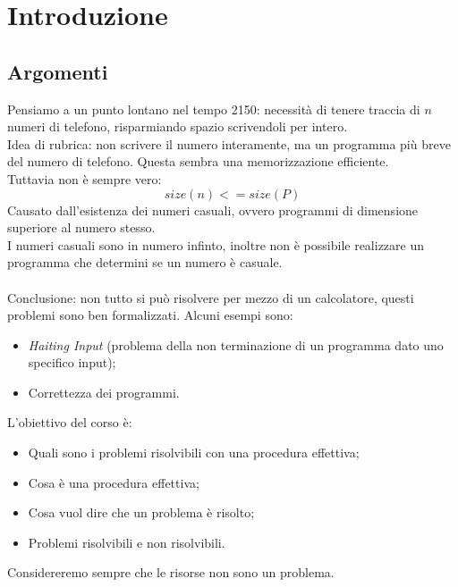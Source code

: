 \documentclass[10pt,a4paper]{book}
\begin{document}
\chapter{Introduzione}
\section{Argomenti}
Pensiamo a un punto lontano nel tempo 2150: necessit\`a di tenere traccia di $n$ numeri di telefono, risparmiando spazio scrivendoli per intero.\\
Idea di rubrica: non scrivere il numero interamente, ma un programma pi\`u breve del numero di telefono. Questa sembra una memorizzazione efficiente.\\
Tuttavia non \`e sempre vero:
\begin{equation}size(n) <= size(P)\end{equation}
Causato dall'esistenza dei numeri casuali, ovvero programmi di dimensione superiore al numero stesso.\\
I numeri casuali sono in numero infinto, inoltre non \`e possibile realizzare un programma che determini se un numero \`e casuale.\\\\
Conclusione: non tutto si pu\`o risolvere per mezzo di un calcolatore, questi problemi sono ben formalizzati. Alcuni esempi sono:
\begin{itemize}
\item \textit{Haiting Input} (problema della non terminazione di un programma dato uno specifico input);
\item Correttezza dei programmi.
\end{itemize}
L'obiettivo del corso \`e:
\begin{itemize}
\item Quali sono i problemi risolvibili con una procedura effettiva;
\item Cosa \`e una procedura effettiva;
\item Cosa vuol dire che un problema \`e risolto;
\item Problemi risolvibili e non risolvibili.
\end{itemize}
\noindent
Considereremo sempre che le risorse non sono un problema.
\end{document}
